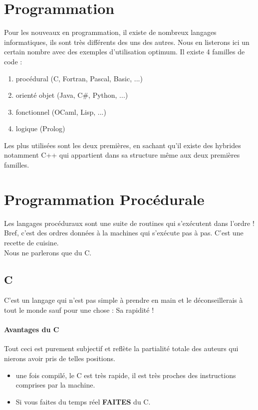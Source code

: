 \section{Programmation}

Pour les nouveaux en programmation, il existe de nombreux langages informatiques, ils sont très 
différents des uns des autres. Nous en listerons ici un certain nombre avec des exemples d'utilisation 
optimum. 
Il existe 4 familles de code :

\begin{enumerate}
\item procédural (C, Fortran, Pascal, Basic, ...)
\item orienté objet (Java, C\#, Python, ...)
\item fonctionnel (OCaml, Lisp, ...)
\item logique (Prolog)
\end{enumerate}

Les plus utilisées sont les deux premières, en sachant qu'il existe des hybrides notamment C++ 
qui appartient dans sa structure même aux deux premières familles. 

\section{Programmation Procédurale}

Les langages procéduraux sont une suite de routines qui s'exécutent dans l'ordre ! Bref, c'est des ordres 
données à la machines qui s'exécute pas à pas. C'est une recette de cuisine.\\

Nous ne parlerons que du C. 

\subsection{C}

C'est un langage qui n'est pas simple à prendre en main et le déconseillerais à tout le monde sauf pour 
une chose : Sa rapidité ! 

\paragraph{Avantages du C}

Tout ceci est purement subjectif et reflète la partialité totale des auteurs qui nierons
 avoir pris de telles positions.
\begin{itemize}
\item une fois compilé, le C est très rapide, il est très proches des instructions comprises par la machine. 
\item Si vous faites du temps réel \textbf{FAITES} du C.
\end{itemize}

